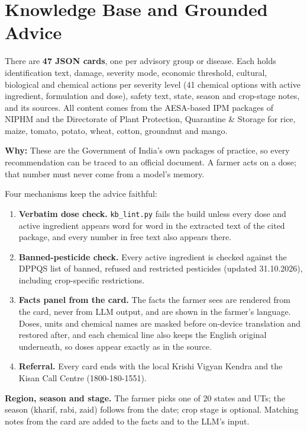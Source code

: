 \documentclass[11pt,a4paper]{article}
\newcommand{\why}[1]{\par\smallskip\noindent\colorbox{leaflight}{\parbox{\dimexpr\linewidth-2\fboxsep}{\small\textbf{\color{leaf}Why:} #1}}\par\smallskip}
\begin{document}
\section{Knowledge Base and Grounded Advice}

There are \textbf{47 JSON cards}, one per advisory group or disease. Each holds identification text, damage, severity
mode, economic threshold, cultural, biological and chemical actions per severity level (41 chemical options with active
ingredient, formulation and dose), safety text, state, season and crop-stage notes, and its sources. All content comes
from the AESA-based IPM packages of NIPHM and the Directorate of Plant Protection, Quarantine \& Storage for rice,
maize, tomato, potato, wheat, cotton, groundnut and mango.

\why{These are the Government of India's own packages of practice, so every recommendation can be traced to an official
document. A farmer acts on a dose; that number must never come from a model's memory.}

Four mechanisms keep the advice faithful:
\begin{enumerate}
\item \textbf{Verbatim dose check.} \texttt{kb\_lint.py} fails the build unless every dose and active ingredient
appears word for word in the extracted text of the cited package, and every number in free text also appears there.
\item \textbf{Banned-pesticide check.} Every active ingredient is checked against the DPPQS list of banned, refused and
restricted pesticides (updated 31.10.2026), including crop-specific restrictions.
\item \textbf{Facts panel from the card.} The facts the farmer sees are rendered from the card, never from LLM output,
and are shown in the farmer's language. Doses, units and chemical names are masked before on-device translation and restored after, and each
chemical line also keeps the English original underneath, so doses appear exactly as in the source.
\item \textbf{Referral.} Every card ends with the local Krishi Vigyan Kendra and the Kisan Call Centre (1800-180-1551).
\end{enumerate}

\textbf{Region, season and stage.} The farmer picks one of 20 states and UTs; the season (kharif, rabi, zaid) follows
from the date; crop stage is optional. Matching notes from the card are added to the facts and to the LLM's input.
\end{document}
